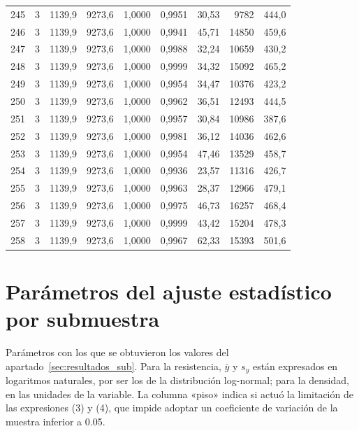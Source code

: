 \documentclass[11pt,a4paper]{article}
\begin{document}
{\begin{longtable}{r c r r r r r r r}
245 & 3 & 1139,9 & 9273,6 & 1,0000 & 0,9951 & 30,53 & 9782 & 444,0 \\
246 & 3 & 1139,9 & 9273,6 & 1,0000 & 0,9941 & 45,71 & 14850 & 459,6 \\
247 & 3 & 1139,9 & 9273,6 & 1,0000 & 0,9988 & 32,24 & 10659 & 430,2 \\
248 & 3 & 1139,9 & 9273,6 & 1,0000 & 0,9999 & 34,32 & 15092 & 465,2 \\
249 & 3 & 1139,9 & 9273,6 & 1,0000 & 0,9954 & 34,47 & 10376 & 423,2 \\
250 & 3 & 1139,9 & 9273,6 & 1,0000 & 0,9962 & 36,51 & 12493 & 444,5 \\
251 & 3 & 1139,9 & 9273,6 & 1,0000 & 0,9957 & 30,84 & 10986 & 387,6 \\
252 & 3 & 1139,9 & 9273,6 & 1,0000 & 0,9981 & 36,12 & 14036 & 462,6 \\
253 & 3 & 1139,9 & 9273,6 & 1,0000 & 0,9954 & 47,46 & 13529 & 458,7 \\
254 & 3 & 1139,9 & 9273,6 & 1,0000 & 0,9936 & 23,57 & 11316 & 426,7 \\
255 & 3 & 1139,9 & 9273,6 & 1,0000 & 0,9963 & 28,37 & 12966 & 479,1 \\
256 & 3 & 1139,9 & 9273,6 & 1,0000 & 0,9975 & 46,73 & 16257 & 468,4 \\
257 & 3 & 1139,9 & 9273,6 & 1,0000 & 0,9999 & 43,42 & 15204 & 478,3 \\
258 & 3 & 1139,9 & 9273,6 & 1,0000 & 0,9967 & 62,33 & 15393 & 501,6 \\
\end{longtable}
}

\section{Parámetros del ajuste estadístico por submuestra}
\label{anx:estadistica}

Parámetros con los que se obtuvieron los valores del apartado~\ref{sec:resultados_sub}.
Para la resistencia, $\bar{y}$ y $s_{y}$ están expresados en logaritmos naturales, por
ser los de la distribución log-normal; para la densidad, en las unidades de la variable.
La columna «piso» indica si actuó la limitación de las expresiones (3) y (4), que impide
adoptar un coeficiente de variación de la muestra inferior a \num{0,05}.
\end{document}
